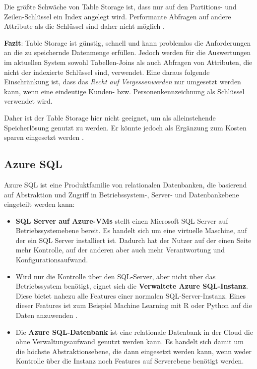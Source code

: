 Die größte Schwäche von Table Storage ist, dass nur auf den Partitions- und Zeilen-Schlüssel ein Index angelegt wird. Performante Abfragen auf andere Attribute als die Schlüssel sind daher nicht möglich \cite{reagan_web_2018}.

\textbf{Fazit}: Table Storage ist günstig, schnell und kann problemlos die Anforderungen an die zu speichernde Datenmenge erfüllen. Jedoch werden für die Auswertungen im aktuellen System sowohl Tabellen-Joins als auch Abfragen von Attributen, die nicht der indexierte Schlüssel sind, verwendet. Eine daraus folgende Einschränkung ist, dass das \textit{Recht auf Vergessenwerden} nur umgesetzt werden kann, wenn eine eindeutige Kunden- bzw. Personenkennzeichnung als Schlüssel verwendet wird.

Daher ist der Table Storage hier nicht geeignet, um als alleinstehende Speicherlösung genutzt zu werden. Er könnte jedoch als Ergänzung zum Kosten sparen eingesetzt werden \cite[vgl.][]{reagan_web_2018}. 

\subsection{Azure SQL} \label{sec:grundlagen:azure_dienste:sql}
Azure SQL ist eine Produktfamilie von relationalen Datenbanken, die basierend auf Abstraktion und Zugriff in Betriebssystem-, Server- und Datenbankebene eingeteilt werden kann:

\begin{itemize}
\item \textbf{SQL Server auf Azure-VMs} stellt einen Microsoft SQL Server auf Betriebssystemebene bereit. Es handelt sich um eine virtuelle Maschine, auf der ein SQL Server installiert ist. Dadurch hat der Nutzer auf der einen Seite mehr Kontrolle, auf der anderen aber auch mehr Verantwortung und Konfigurationsaufwand. 
\item Wird nur die Kontrolle über den SQL-Server, aber nicht über das Betriebssystem benötigt, eignet sich die \textbf{Verwaltete Azure SQL-Instanz}. Diese bietet nahezu alle Features einer normalen SQL-Server-Instanz. Eines dieser Features ist zum Beispiel Machine Learning mit R oder Python auf die Daten anzuwenden \cite{ericson_was_2021}.
\item Die \textbf{Azure SQL-Datenbank} ist eine relationale Datenbank in der Cloud die ohne Verwaltungsaufwand genutzt werden kann. Es handelt sich damit um die höchste Abstraktionsebene, die dann eingesetzt werden kann, wenn weder Kontrolle über die Instanz noch Features auf Serverebene benötigt werden.
\end{itemize}
\cite{mauri_azure_2021}

